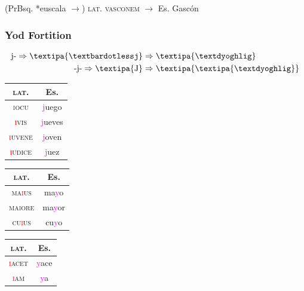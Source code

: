 \documentclass{report}[12pt]
\begin{document}
(PrBsq. *euscala $\rightarrow$) \textsc{lat.} \textsc{vasconem} $\rightarrow$ Es. Gasc\'{o}n

\subsubsection*{Yod Fortition}

\begin{tcolorbox}
  \begin{align*}
    \text{j-} \Rightarrow \text{\textipa{\textbardotlessj}} & \Rightarrow \text{\textipa{\textdyoghlig}} \\
    \text{-j-} \Rightarrow \text{\textipa{J}} & \Rightarrow \text{\textipa{\textipa{\textdyoghlig}}} \\
  \end{align*}
\end{tcolorbox}

\begin{tabular}{c c}
  \textsc{lat.} & Es. \\
  \hline
  \textsc{\textcolor{red}{i}ocu} & \textcolor{magenta}{j}uego \quad [x] \\
  \textsc{\textcolor{red}{i}vis} & \textcolor{magenta}{j}ueves \quad [x] \\
  \textsc{\textcolor{red}{i}uvene} & \textcolor{magenta}{j}oven \quad [x] \\
  \textsc{\textcolor{red}{i}udice} & \textcolor{magenta}{j}uez \quad [x] \\
\end{tabular}

\begin{tabular}{c c}
  \textsc{lat.} & Es. \\
  \hline
  \textsc{ma\textcolor{red}{i}us} & ma\textcolor{magenta}{y}o \\
  \textsc{ma\textcolor{red}{i}ore} & ma\textcolor{magenta}{y}or \\
  \textsc{cu\textcolor{red}{i}us} & cu\textcolor{magenta}{y}o \\
\end{tabular}

\begin{tabular}{c c}
  \textsc{lat.} & Es. \\
  \hline
  \textsc{\textcolor{red}{i}acet} & \textcolor{magenta}{y}ace \\
  \textsc{\textcolor{red}{i}am} & \textcolor{magenta}{y}a \\
\end{tabular}
\end{document}
